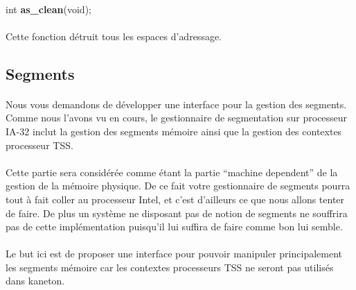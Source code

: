 \documentclass[10pt,a4wide]{article}
\begin{document}
\paragraph{}

\hspace{1.5cm}int \textbf{as\_clean}(void);

\paragraph{}

Cette fonction d\'etruit tous les espaces d'adressage.

\subsection{Segments}

\paragraph{}

Nous vous demandons de d\'evelopper une interface pour la gestion des
segments. Comme nous l'avons vu en cours, le gestionnaire
de segmentation sur processeur IA-32 inclut la gestion des segments
m\'emoire ainsi que la gestion des contextes processeur TSS.

\paragraph{}

Cette partie sera consid\'er\'ee comme \'etant la partie ``machine
dependent'' de la gestion de la m\'emoire physique. De ce fait votre
gestionnaire de segments pourra tout \`a fait coller au processeur
Intel, et c'est d'ailleurs ce que nous allons tenter de faire.
De plus un syst\`eme ne disposant pas de notion de segments ne souffrira
pas de cette impl\'ementation puisqu'il lui suffira de faire comme bon
lui semble.

\paragraph{}

Le but ici est de proposer une interface pour pouvoir manipuler principalement
les segments m\'emoire car les contextes processeurs TSS ne seront pas
utilis\'es dans kaneton.

\paragraph{}
\end{document}
